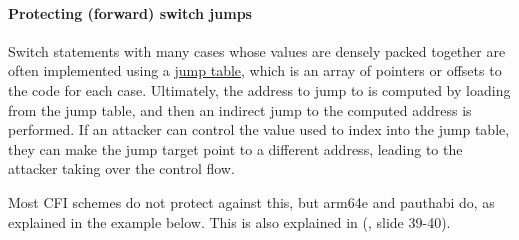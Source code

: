 \documentclass[
  a4paper,
]{report}
\begin{document}
\paragraph{Protecting (forward) switch
jumps}\label{protecting-forward-switch-jumps}

Switch statements with many cases whose values are densely packed
together are often implemented using a
\href{https://en.wikipedia.org/wiki/Branch_table}{\label{__index_entry_40}{jump
table}}, which is an array of pointers or offsets to
the code for each case. Ultimately, the address to jump to is computed
by loading from the jump table, and then an indirect jump to the
computed address is performed. If an attacker can control the value used
to index into the jump table, they can make the jump target point to a
different address, leading to the attacker taking over the control flow.

Most CFI schemes do not protect against this, but
\label{__index_entry_41}{arm64e} and
\label{__index_entry_42}{pauthabi} do, as
explained in the example below. This is also explained in
(, slide 39-40).
\end{document}
